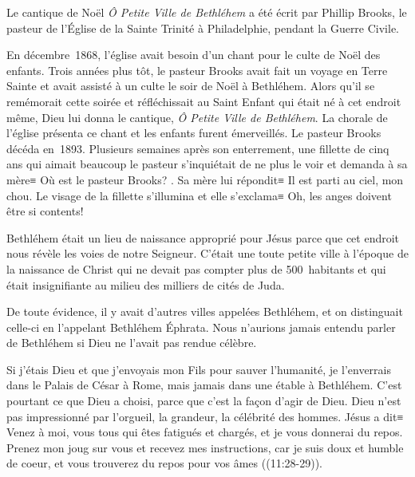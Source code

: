

Le cantique de Noël \emph{Ô Petite Ville de Bethléhem} a été écrit par Phillip Brooks, le pasteur de l'Église de la Sainte Trinité à Philadelphie, pendant la Guerre Civile.

En décembre~1868, l'église avait besoin d'un chant pour le culte de Noël des enfants. Trois années plus tôt, le pasteur Brooks avait fait un voyage en Terre Sainte et avait assisté à un culte le soir de Noël à Bethléhem. Alors qu'il se remémorait cette soirée et réfléchissait au Saint Enfant qui était né à cet endroit même, Dieu lui donna le cantique, \emph{Ô Petite Ville de Bethléhem}. La chorale de l'église présenta ce chant et les enfants furent émerveillés. Le pasteur Brooks décéda en~1893. Plusieurs semaines après son enterrement, une fillette de cinq ans qui aimait beaucoup le pasteur s'inquiétait de ne plus le voir et demanda à sa mère≡ \og Où est le pasteur Brooks? \fg{}. Sa mère lui répondit≡ \og Il est parti au ciel, mon chou. \fg{} Le visage de la fillette s'illumina et elle s'exclama≡ \og Oh, les anges doivent être si contents! \fg{}

Bethléhem était un lieu de naissance approprié pour Jésus parce que cet endroit nous révèle les voies de notre Seigneur. C'était une toute petite ville à l'époque de la naissance de Christ qui ne devait pas compter plus de 500~habitants et qui était insignifiante au milieu des milliers de cités de Juda.

De toute évidence, il y avait d'autres villes appelées Bethléhem, et on distinguait celle-ci en l'appelant Bethléhem Éphrata. Nous n'aurions jamais entendu parler de Bethléhem si Dieu ne l'avait pas rendue célèbre.

Si j'étais Dieu et que j'envoyais mon Fils pour sauver l'humanité, je l'enverrais dans le Palais de César à Rome, mais jamais dans une étable à Bethléhem. C'est pourtant ce que Dieu a choisi, parce que c'est la façon d'agir de Dieu. Dieu n'est pas impressionné par l'orgueil, la grandeur, la célébrité des hommes. Jésus a dit≡
\og Venez à moi, vous tous qui êtes fatigués et chargés, et je vous donnerai du repos. Prenez mon joug sur vous et recevez mes instructions, car je suis doux et humble de coeur, et vous trouverez du repos pour vos âmes \fg{} ((11:28-29)).


